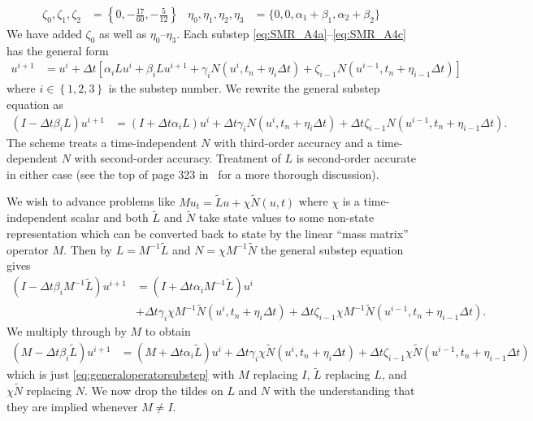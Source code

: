 \documentclass[letterpaper,11pt,nointlimits,reqno]{amsart}
\begin{document}
\begin{align*}
  \zeta_0, \zeta_1, \zeta_2 &= \left\{
    0, -\frac{17}{60}, -\frac{5}{12}
  \right\}
  &
  \eta_0, \eta_1, \eta_2, \eta_3 &= \Biggl\{
    0, 0, \alpha_{1}+\beta_{1}, \alpha_{2}+\beta_{2}
  \Biggr\}
\end{align*}
We have added $\zeta_0$ as well as $\eta_{0}$--$\eta_{3}$.  Each substep
\eqref{eq:SMR_A4a}--\eqref{eq:SMR_A4c} has the general form
\begin{align}
  u^{i+1} &= u^i + \Delta{}t \left[
        \alpha_{i} L u^i
      + \beta_{i}  L u^{i+1}
      + \gamma_{i} N\left( u^{i}, t_{n}+\eta_{i}\Delta{}t \right)
      + \zeta_{i-1} N\left( u^{i-1}, t_{n}+\eta_{i-1}\Delta{}t \right)
  \right]
  \label{eq:generalsubstep}
\end{align}
where $i\in\left\{ 1,2,3 \right\}$ is the substep number.
We rewrite the general substep equation as
\begin{align}
  \left(I - \Delta{}t\beta_{i}L\right) u^{i+1}
  &=
  \left(I + \Delta{}t\alpha_{i}L\right) u^{i}
  + \Delta{}t\gamma_{i}N\left(u^{i}, t_{n}+\eta_{i}\Delta{}t\right)
  + \Delta{}t\zeta_{i-1}N\left(u^{i-1}, t_{n}+\eta_{i-1}\Delta{}t\right)
  \label{eq:generaloperatorsubstep}
  .
\end{align}
The scheme treats a time-independent $N$ with third-order accuracy and a
time-dependent $N$ with second-order accuracy.  Treatment of $L$ is
second-order accurate in either case (see the top of page 323
in~\cite{spalart_lowstoragerk} for a more thorough discussion).

We wish to advance problems like $Mu_{t}=\tilde{L}u+\chi\tilde{N}\left( u,t
\right)$ where $\chi$ is a time-independent scalar and both $\tilde{L}$ and
$\tilde{N}$ take state values to some non-state representation which can be
converted back to state by the linear ``mass matrix'' operator $M$.  Then by
$L=M^{-1}\tilde{L}$ and $N=\chi{}M^{-1}\tilde{N}$ the general substep equation
gives
\begin{align}
  \left(I - \Delta{}t\beta_{i}M^{-1}\tilde{L}\right) u^{i+1}
  &=
  \left(I + \Delta{}t\alpha_{i}M^{-1}\tilde{L}\right) u^{i}
\\
  &+ \Delta{}t\gamma_{i}\chi{}M^{-1}
    \tilde{N}\left(u^{i}, t_{n}+\eta_{i}\Delta{}t\right)
  + \Delta{}t\zeta_{i-1}\chi{}M^{-1}
    \tilde{N}\left(u^{i-1}, t_{n}+\eta_{i-1}\Delta{}t\right)
  .
\end{align}
We multiply through by $M$ to obtain
\begin{align}
  \left(M - \Delta{}t\beta_{i}\tilde{L}\right) u^{i+1}
  &=
  \left(M + \Delta{}t\alpha_{i}\tilde{L}\right) u^{i}
  + \Delta{}t\gamma_{i}\chi{}
    \tilde{N}\left(u^{i}, t_{n}+\eta_{i}\Delta{}t\right)
  + \Delta{}t\zeta_{i-1}\chi{}
    \tilde{N}\left(u^{i-1}, t_{n}+\eta_{i-1}\Delta{}t\right)
  \label{eq:generaloperatormasssubstep}
\end{align}
which is just \eqref{eq:generaloperatorsubstep} with $M$ replacing $I$,
$\tilde{L}$ replacing $L$, and $\chi{}\tilde{N}$ replacing $N$.  We now drop
the tildes on $L$ and $N$ with the understanding that they are implied whenever
$M\neq{}I$.
\end{document}
